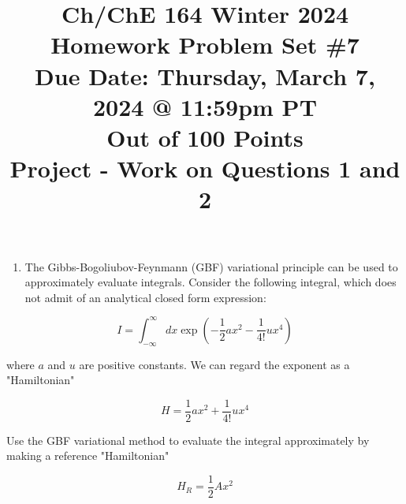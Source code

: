 \documentclass[12pt]{article}
\title{Ch/ChE 164 Winter 2024 \\
 Homework Problem Set \#7 \\
 Due Date: Thursday, March 7, 2024 @ 11:59pm PT \\
 Out of 100 Points \\
 Project - Work on Questions 1 and 2 }
\author{}
\date{}
\begin{document}
\maketitle
\section{}
\begin{enumerate}
  \item The Gibbs-Bogoliubov-Feynmann (GBF) variational principle can be used to approximately evaluate integrals. Consider the following integral, which does not admit of an analytical closed form expression:
\end{enumerate}


\begin{equation*}
I=\int_{-\infty}^{\infty} d x \exp \left(-\frac{1}{2} a x^{2}-\frac{1}{4 !} u x^{4}\right) \tag{1}
\end{equation*}


where $a$ and $u$ are positive constants. We can regard the exponent as a "Hamiltonian"


\begin{equation*}
H=\frac{1}{2} a x^{2}+\frac{1}{4 !} u x^{4} \tag{2}
\end{equation*}


Use the GBF variational method to evaluate the integral approximately by making a reference "Hamiltonian"


\begin{equation*}
H_{R}=\frac{1}{2} A x^{2} \tag{3}
\end{equation*}
\end{document}
